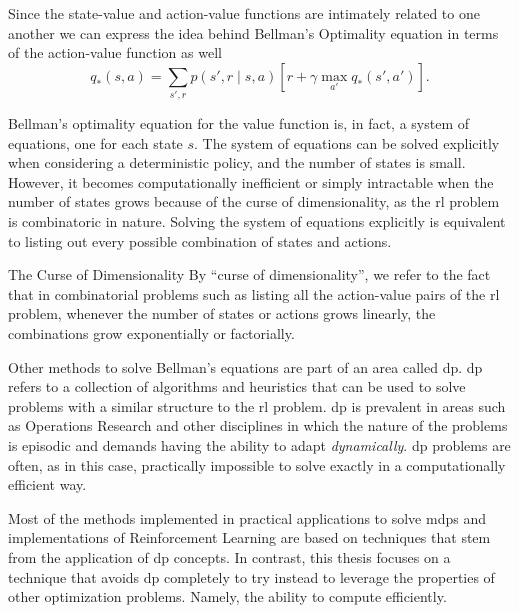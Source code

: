 Since the state-value and action-value functions are intimately related to one
another we can express the idea behind Bellman's Optimality equation in terms of
the action-value function as well
\[
	q_* (s, a) = \sum_{s', r} p(s', r \mid s, a) \left[ r + \gamma \max_{a'} q_{*} (s', a') \right].
\]

Bellman's optimality equation for the value function is, in fact, a system of
equations, one for each state $s$. The system of equations can be solved
explicitly when considering a deterministic policy, and the number of states is
small. However, it becomes computationally inefficient or simply intractable
when the number of states grows because of the curse of dimensionality, as the
\ac{rl} problem is combinatoric in nature. Solving the system of equations
explicitly is equivalent to listing out every possible combination of states and
actions.

\begin{remark}{The Curse of Dimensionality}
	By ``curse of dimensionality'', we refer to the fact that in combinatorial
	problems such as listing all the action-value pairs of the \ac{rl} problem,
	whenever the number of states or actions grows linearly, the combinations
	grow exponentially or factorially.
\end{remark}

Other methods to solve Bellman's equations are part of an area called \acf{dp}.
\Ac{dp} refers to a collection of algorithms and heuristics that can be used to
solve problems with a similar structure to the \ac{rl} problem. \Ac{dp} is
prevalent in areas such as Operations Research and other disciplines in which
the nature of the problems is episodic and demands having the ability to adapt
\textit{dynamically}. \Ac{dp} problems are often, as in this case, practically
impossible to solve exactly in a computationally efficient way.

Most of the methods implemented in practical applications to solve \aclp{mdp}
and implementations of Reinforcement Learning are based on techniques that stem
from the application of \ac{dp} concepts. In contrast, this thesis focuses on a
technique that avoids \ac{dp} completely to try instead to leverage the
properties of other optimization problems. Namely, the ability to compute
efficiently.